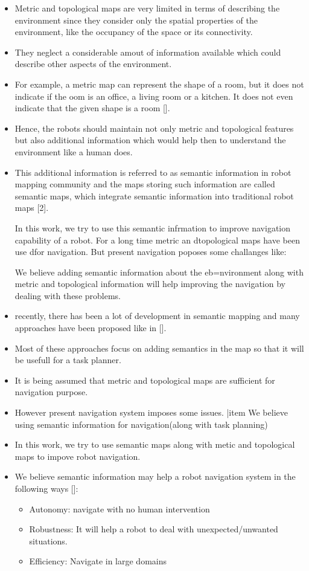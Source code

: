 \begin{itemize}
 \item Metric and topological maps are very limited in terms of describing the environment since they consider only the spatial properties of the environment, like the occupancy of the space or its connectivity.
 \item They neglect a considerable amout of information available which could describe other aspects of the environment.
 \item For example, a metric map can represent the shape of a room, but it does not indicate if the oom is an office, a living room or a kitchen. It does not even indicate that the given shape is a room [].
 \item Hence, the robots should maintain not only metric and topological features but also additional information which would help then to understand the environment like a human does. 
 \item This additional information is referred to as semantic information in robot mapping community and the maps storing such information are called semantic maps, which integrate semantic information into traditional robot maps [2].
 
 
 
 In this work, we try to use this semantic infrmation to improve navigation capability of a robot.
 For a long time metric an dtopological maps have been use dfor navigation.
 But present navigation poposes some challanges like:
 
 
 We believe adding semantic information about the eb=nvironment along with metric and topological information will help improving the navigation by dealing with these problems.
 
 
 \item recently, there has been a lot of development in semantic mapping and many approaches have been proposed like in [].
 \item Most of these approaches focus on adding semantics in the map so that it will be usefull for a task planner. 
 \item It is being assumed that metric and topological maps are sufficient for navigation purpose.
\item However present navigation system imposes some issues. 
 |item We believe using semantic information for navigation(along with task planning)  
 \item In this work, we try to use semantic maps along with metic and topological maps to impove robot navigation. 
 \item We believe semantic information may help a robot navigation system in the following ways []:
  \begin{itemize}
    \item Autonomy: navigate with no human intervention
    \item Robustness: It will help a robot to deal with unexpected/unwanted situations.
    \item Efficiency: Navigate in large domains 
  \end{itemize}
  

\end{itemize}
